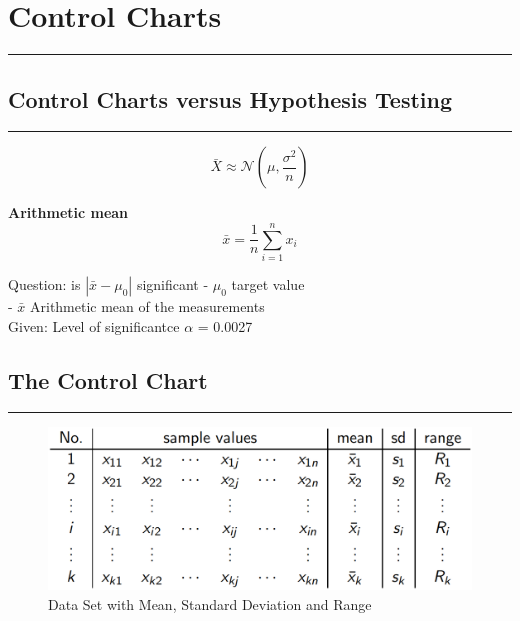 \section{Control Charts}
\noindent\rule[\linienAbstand]{\linewidth}{\linienDickeDick}

\subsection{Control Charts versus Hypothesis Testing}
\noindent\rule[\linienAbstand]{\linewidth}{\linienDicke}
\begin{equation}
  \bar{X} \approx \mathcal{N}\left(\mu, \frac{\sigma^{2}}{n}\right)
\end{equation}



\textbf{Arithmetic mean}
\begin{equation}
  \bar{x} = \frac{1}{n} \sum_{i=1}^n x_i
\end{equation}

Question: is $\left|\bar{x} - \mu_0\right|$ significant
- $\mu_0$ target value\\
- $\bar{x}$ Arithmetic mean of the measurements\\
Given: Level of significantce $\alpha$ = 0.0027

\subsection{The Control Chart}
\noindent\rule[\linienAbstand]{\linewidth}{\linienDicke}

\begin{figure}[H]
  \centering
  \includegraphics[width = 0.8\linewidth]{Pics/2.1.png}
  \caption{Data Set with Mean, Standard Deviation and Range}
  \label{2.1}
\end{figure}

